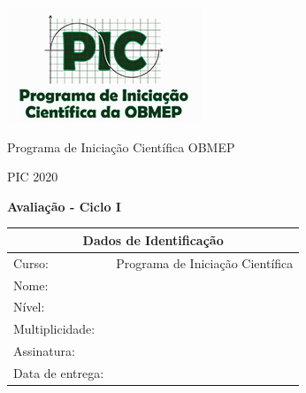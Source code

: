 \documentclass[oneside,a4paper,12pt]{article}
\theoremstyle{Colorido}
\theoremstyle{solu}
\theoremstyle{dotlessP}
\newcommand{\universidade}{Programa de Iniciação Científica OBMEP}
\newcommand{\centro}{PIC 2020}
\newcommand{\professor}{Douglas de Araujo Smigly}
\newcommand{\disciplina}{Programa de Iniciação Científica}
\newcommand{\entrega}{ }
\begin{document}
	\pagestyle{empty}
	
	\begin{center}
	\includegraphics[width=\linewidth/3]{logo_pic}%
	 	\vspace{0pt}
	 	
		\universidade
		\par
		\centro
		\par
		\par
		\par
		\vspace{24pt}
		\LARGE \textbf{Avalia\c c\~ao - Ciclo I}
		
	\end{center}
	
	\vspace{24pt}
	
%		
%	
	

	\begin{tabular}{ |l|p{12cm}| }
		
		\hline
		\multicolumn{2}{|c|}{\textbf{Dados de Identificação}} \\
			\hline
		Curso:        &  \disciplina \\
			\hline
		Nome:        &  \\
		\hline
		Nível:      &  \\
		\hline
				Multiplicidade:      &  \\
		\hline
				Assinatura:      &  \\
		\hline
				Data de entrega:      &  \entrega \\
		\hline
	\end{tabular}
	
\end{document}
